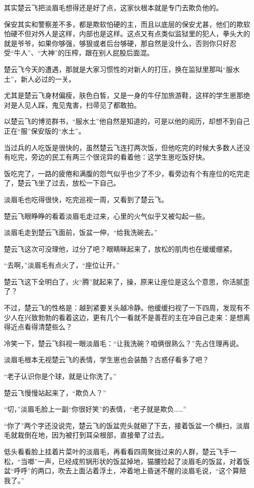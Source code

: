其实楚云飞把淡眉毛想得还是好了点，这家伙根本就是专门去欺负他的。

保安其实和警察差不多，都是欺软怕硬的主，而且以底层的保安尤甚，他们的欺软怕硬不但对外人是这样，内部也是这样。这点又有点类似监狱里的犯人，拳头大的就是爷爷，如果你够强，够狠或者后台够硬，那自然是没什么，否则你只好忍受“牛人”、“大神”的压榨，跟在别人屁股后面混。

楚云飞今天的遭遇，那就是大家习惯性的对新人的打压，换在监狱里那叫“服水土”，新人必过的一关。

尤其是楚云飞身材偏瘦，肤色白皙，又是一身的牛仔加旅游鞋，这样的学生崽那绝对是人见人踩，鬼见鬼害，扫帚见了都敢拍。

以楚云飞的博览群书，“服水土”他自然是知道的，可是以他的阅历，却想不到自己正在“服”保安版的“水土”。

当过兵的人吃饭是很快的，虽然楚云飞连打两次饭，但他吃完的时候大多数人还没有吃完，旁边的民工有两三个很诧异的看着他：这学生崽吃饭好快。

饭吃完了，一路的疲倦和满腹的怨气似乎也少了不少，看旁边有个有座位的吃完走了，楚云飞坐了过去，放松一下自己。

淡眉毛也吃得很快，吃完巡视一周，又看到了楚云飞。

楚云飞眼睁睁的看着淡眉毛走过来，心里的火气似乎又被勾起一些。

淡眉毛走到楚云飞面前，饭盆一伸，“给我洗碗去。”

楚云飞这次可没理他，过分了吧？眼睛眯起来了，放松的肌肉也在缓缓绷紧。

“去啊，”淡眉毛有点火了，“座位让开。”

楚云飞这下全明白了，火“腾”就起来了，操，原来让座位是这么个意思，你活腻歪了？

不过，楚云飞的性格是：越到紧要关头越冷静。他缓缓扫视了一下四周，发现有不少人在兴致勃勃的看着这边，更有几个一看就不是善茬的主在冲自己走来：是想离得近点看得清楚些么？

冷笑一下，楚云飞斜视一眼淡眉毛：“让我洗碗？咱俩很熟么？”先占住理再说。

淡眉毛根本无视楚云飞的表情，学生崽也会装酷？古惑仔看多了吧？

“老子认识你是个球，就是让你洗了。”

楚云飞慢慢站起来了，“欺负人？”

“切，”淡眉毛脸上一副“你很好笑”的表情，“老子就是欺负……”

“你了”两个字还没说完，楚云飞的饭盆兜头就砸了下去，接着饭盆一个横扫，淡眉毛就栽倒在地，因为被打到耳朵根部，直接晕了过去。

低头看看脸上挂着片菜叶的淡眉毛，再看看四周聚拢过来的人群，楚云飞手一松，“当啷”一声，已经成煎锅形状的饭盆掉地，猫腰捡起了淡眉毛的饭盆，对着饭盆“呼呼”的两口，吹去上面沾着浮土，冲着地上昏迷不醒的淡眉毛说，“这个算赔我了。”

